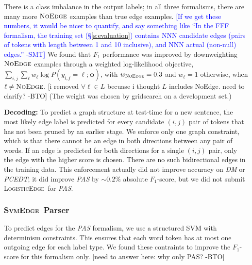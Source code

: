 \documentclass[11pt]{article}
\newcommand{\bocomment}[1]{\textcolor{Bittersweet}{[#1 -BTO]}}
\newcommand{\sam}[1]{\textcolor{blue}{[#1 -SMT]}}
\newcommand{\codenote}[1]{}
\newcommand{\logitedge}{\textsc{LogisticEdge}}
\newcommand{\svmedge}{\textsc{SvmEdge}}
\newcommand{\noedge}{\textsc{NoEdge}}
\begin{document}
There is a class imbalance in the output labels; in all three formalisms, there
are many more $\noedge$ examples than true edge examples.
\sam{If we get these numbers, it would be nicer to quantify, and say something
like ``In the FFF formalism, the training set (\S\ref{s:evaluation}) contains NNN
candidate edges (pairs of tokens with length between 1 and 10 inclusive), and NNN actual (non-null) edges.''}
We found that $F_1$ performance was improved by
downweighting $\noedge$ examples through a weighted log-likelihood objective,
$\sum_{i,j} \sum_\ell w_\ell \log P(y_{i,j}=\ell; \bm\phi)$, with $w_{\noedge}=0.3$
and $w_{\ell} = 1$ otherwise, when $\ell \neq \noedge$.
\bocomment{i removed $\forall \ell \in L$ becuase i thought $L$ includes NoEdge. need to clarify?}
(The weight was chosen by gridsearch on a development set.)




\textbf{Decoding:} \codenote{MyGraph::decodeEdgeProbsToGraph()}
To predict a graph structure at test-time for a new sentence,
the most likely edge label is predicted for every candidate $(i, j)$ pair of
tokens that has not been pruned by an earlier stage.
We enforce only one graph constraint, which is that there cannot be
an edge in both directions between any pair of words.
If an edge is predicted for both directions for a single $(i, j)$
pair, only the edge with the higher score is chosen.
There are no such bidirectional edges in the training data.
This enforcement actually did not improve accuracy on \emph{DM} or \emph{PCEDT};
it did improve \emph{PAS} by $\sim 0.2\%$ absolute $F_1$-score, but we did not submit \logitedge\ for \emph{PAS}.
\codenote{\url{https://github.com/Noahs-ARK/semeval-2014/pull/21}}


\subsubsection{\svmedge~Parser}
\label{s:graphparser}


To predict edges for the \emph{PAS} formalism, we use a structured SVM
with determinism constraints.
This ensures that each word token has at most one outgoing edge for each label
type.  We found these contraints to improve the $F_1$-score for this formalism only.
\bocomment{need to answer here: why only PAS?}
\end{document}
